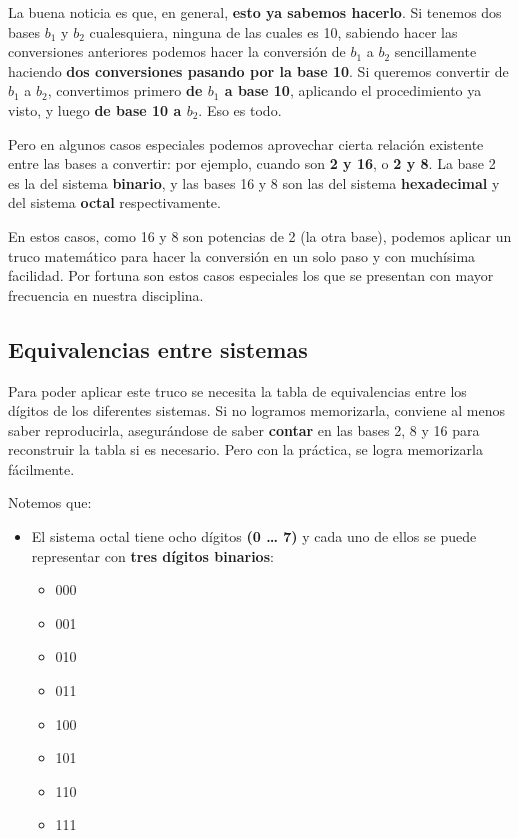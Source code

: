 \documentclass[spanish,a4paper,]{article}
\providecommand{\tightlist}{%
  \setlength{\itemsep}{0pt}\setlength{\parskip}{0pt}}
\begin{document}
La buena noticia es que, en general, \textbf{esto ya sabemos hacerlo}.
Si tenemos dos bases \(b_1\) y \(b_2\) cualesquiera, ninguna de las
cuales es 10, sabiendo hacer las conversiones anteriores podemos hacer
la conversión de \(b_1\) a \(b_2\) sencillamente haciendo \textbf{dos
conversiones pasando por la base 10}. Si queremos convertir de \(b_1\) a
\(b_2\), convertimos primero \textbf{de \(b_1\) a base 10}, aplicando el
procedimiento ya visto, y luego \textbf{de base 10 a \(b_2\)}. Eso es
todo.

Pero en algunos casos especiales podemos aprovechar cierta relación
existente entre las bases a convertir: por ejemplo, cuando son \textbf{2
y 16}, o \textbf{2 y 8}. La base 2 es la del sistema \textbf{binario}, y
las bases 16 y 8 son las del sistema \textbf{hexadecimal} y del sistema
\textbf{octal} respectivamente.

En estos casos, como 16 y 8 son potencias de 2 (la otra base), podemos
aplicar un truco matemático para hacer la conversión en un solo paso y
con muchísima facilidad. Por fortuna son estos casos especiales los que
se presentan con mayor frecuencia en nuestra disciplina.

\hypertarget{equivalencias-entre-sistemas}{%
\subsection{Equivalencias entre
sistemas}\label{equivalencias-entre-sistemas}}

Para poder aplicar este truco se necesita la tabla de equivalencias
entre los dígitos de los diferentes sistemas. Si no logramos
memorizarla, conviene al menos saber reproducirla, asegurándose de saber
\textbf{contar} en las bases 2, 8 y 16 para reconstruir la tabla si es
necesario. Pero con la práctica, se logra memorizarla fácilmente.

Notemos que:

\begin{itemize}
\tightlist
\item
  El sistema octal tiene ocho dígitos \textbf{(0 \ldots{} 7)} y cada uno
  de ellos se puede representar con \textbf{tres dígitos binarios}:

  \begin{itemize}
  \tightlist
  \item
    000
  \item
    001
  \item
    010
  \item
    011
  \item
    100
  \item
    101
  \item
    110
  \item
    111
  \end{itemize}
\end{itemize}
\end{document}
